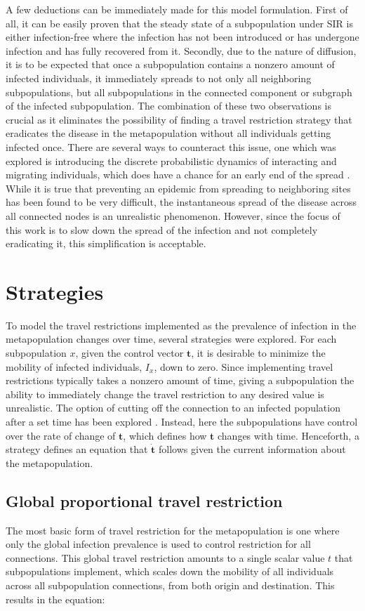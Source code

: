 A few deductions can be immediately made for this model formulation. First of all, it can be easily proven that the steady state of a subpopulation under SIR is either infection-free where the infection has not been introduced or has undergone infection and has fully recovered from it. Secondly, due to the nature of diffusion, it is to be expected that once a subpopulation contains a nonzero amount of infected individuals, it immediately spreads to not only all neighboring subpopulations, but all subpopulations in the connected component or subgraph of the infected subpopulation. The combination of these two observations is crucial as it eliminates the possibility of finding a travel restriction strategy that eradicates the disease in the metapopulation without all individuals getting infected once. There are several ways to counteract this issue, one which was explored is introducing the discrete probabilistic dynamics of interacting and migrating individuals, which does have a chance for an early end of the spread \cite{colizza2008epidemic}. While it is true that preventing an epidemic  from spreading to neighboring sites has been found to be very difficult, the instantaneous spread of the disease across all connected nodes is an unrealistic phenomenon. However, since the focus of this work is to slow down the spread of the infection and not completely eradicating it, this simplification is acceptable. 

\section{Strategies}
To model the travel restrictions implemented as the prevalence of infection in the metapopulation changes over time, several strategies were explored. For each subpopulation $x$, given the control vector $\mathbf{t}$, it is desirable to minimize the mobility of infected individuals, $I_{x}$, down to zero. Since implementing travel restrictions typically takes a nonzero amount of time, giving a subpopulation the ability to immediately change the travel restriction to any desired value is unrealistic. The option of cutting off the connection to an infected population after a set time has been explored \cite{feng2020infectious}. Instead, here the subpopulations have control over the rate of change of $\mathbf{t}$, which defines how $\mathbf{t}$ changes with time. Henceforth, a strategy defines an equation that $\mathbf{\dot{t}}$ follows given the current information about the metapopulation.

\subsection{Global proportional travel restriction}
The most basic form of travel restriction for the metapopulation is one where only the global infection prevalence is used to control restriction for all connections. This global travel restriction amounts to a single scalar value $t$ that subpopulations implement, which scales down the mobility of all individuals across all subpopulation connections, from both origin and destination. This results in the equation:

